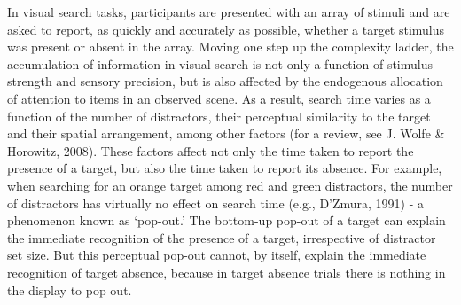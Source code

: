 \documentclass[12pt,twoside]{reedthesis}
\begin{document}
In visual search tasks, participants are presented with an array of stimuli and are asked to report, as quickly and accurately as possible, whether a target stimulus was present or absent in the array. Moving one step up the complexity ladder, the accumulation of information in visual search is not only a function of stimulus strength and sensory precision, but is also affected by the endogenous allocation of attention to items in an observed scene. As a result, search time varies as a function of the number of distractors, their perceptual similarity to the target and their spatial arrangement, among other factors (for a review, see J. Wolfe \& Horowitz, 2008). These factors affect not only the time taken to report the presence of a target, but also the time taken to report its absence. For example, when searching for an orange target among red and green distractors, the number of distractors has virtually no effect on search time (e.g., D'Zmura, 1991) - a phenomenon known as `pop-out.' The bottom-up pop-out of a target can explain the immediate recognition of the presence of a target, irrespective of distractor set size. But this perceptual pop-out cannot, by itself, explain the immediate recognition of target absence, because in target absence trials there is nothing in the display to pop out.
\end{document}
